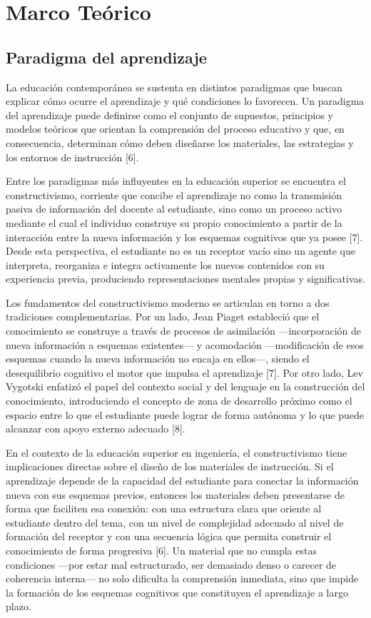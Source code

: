 \documentclass[11pt]{article}
\begin{document}
\newpage
\section*{Marco Teórico}

\subsection*{Paradigma del aprendizaje}

La educación contemporánea se sustenta en distintos paradigmas que buscan explicar cómo ocurre el aprendizaje y qué condiciones lo favorecen. Un paradigma del aprendizaje puede definirse como el conjunto de supuestos, principios y modelos teóricos que orientan la comprensión del proceso educativo y que, en consecuencia, determinan cómo deben diseñarse los materiales, las estrategias y los entornos de instrucción [6].

Entre los paradigmas más influyentes en la educación superior se encuentra el constructivismo, corriente que concibe el aprendizaje no como la transmisión pasiva de información del docente al estudiante, sino como un proceso activo mediante el cual el individuo construye su propio conocimiento a partir de la interacción entre la nueva información y los esquemas cognitivos que ya posee [7]. Desde esta perspectiva, el estudiante no es un receptor vacío sino un agente que interpreta, reorganiza e integra activamente los nuevos contenidos con su experiencia previa, produciendo representaciones mentales propias y significativas.

Los fundamentos del constructivismo moderno se articulan en torno a dos tradiciones complementarias. Por un lado, Jean Piaget estableció que el conocimiento se construye a través de procesos de asimilación —incorporación de nueva información a esquemas existentes— y acomodación —modificación de esos esquemas cuando la nueva información no encaja en ellos—, siendo el desequilibrio cognitivo el motor que impulsa el aprendizaje [7]. Por otro lado, Lev Vygotski enfatizó el papel del contexto social y del lenguaje en la construcción del conocimiento, introduciendo el concepto de zona de desarrollo próximo como el espacio entre lo que el estudiante puede lograr de forma autónoma y lo que puede alcanzar con apoyo externo adecuado [8].

En el contexto de la educación superior en ingeniería, el constructivismo tiene implicaciones directas sobre el diseño de los materiales de instrucción. Si el aprendizaje depende de la capacidad del estudiante para conectar la información nueva con sus esquemas previos, entonces los materiales deben presentarse de forma que faciliten esa conexión: con una estructura clara que oriente al estudiante dentro del tema, con un nivel de complejidad adecuado al nivel de formación del receptor y con una secuencia lógica que permita construir el conocimiento de forma progresiva [6]. Un material que no cumpla estas condiciones —por estar mal estructurado, ser demasiado denso o carecer de coherencia interna— no solo dificulta la comprensión inmediata, sino que impide la formación de los esquemas cognitivos que constituyen el aprendizaje a largo plazo.
\end{document}
